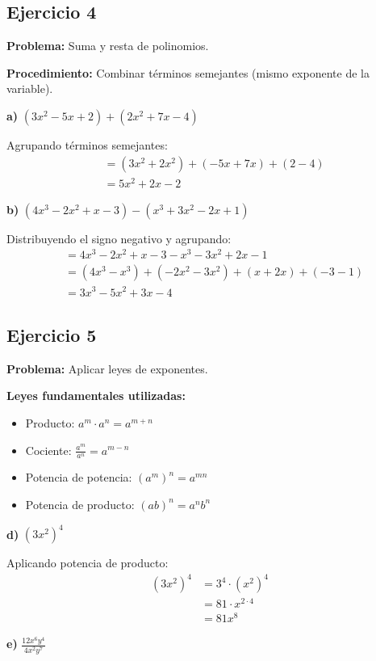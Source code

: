 \subsection*{Ejercicio 4}

\textbf{Problema:} Suma y resta de polinomios.

\textbf{Procedimiento:} Combinar términos semejantes (mismo exponente de la variable).

\textbf{a)} $(3x^2 - 5x + 2) + (2x^2 + 7x - 4)$

Agrupando términos semejantes:
\begin{align}
&= (3x^2 + 2x^2) + (-5x + 7x) + (2 - 4)\\
&= 5x^2 + 2x - 2
\end{align}

\textbf{b)} $(4x^3 - 2x^2 + x - 3) - (x^3 + 3x^2 - 2x + 1)$

Distribuyendo el signo negativo y agrupando:
\begin{align}
&= 4x^3 - 2x^2 + x - 3 - x^3 - 3x^2 + 2x - 1\\
&= (4x^3 - x^3) + (-2x^2 - 3x^2) + (x + 2x) + (-3 - 1)\\
&= 3x^3 - 5x^2 + 3x - 4
\end{align}

\subsection*{Ejercicio 5}

\textbf{Problema:} Aplicar leyes de exponentes.

\textbf{Leyes fundamentales utilizadas:}
\begin{itemize}
    \item Producto: $a^m \cdot a^n = a^{m+n}$
    \item Cociente: $\frac{a^m}{a^n} = a^{m-n}$
    \item Potencia de potencia: $(a^m)^n = a^{mn}$
    \item Potencia de producto: $(ab)^n = a^n b^n$
\end{itemize}

\textbf{d)} $(3x^2)^4$

Aplicando potencia de producto:
\begin{align}
(3x^2)^4 &= 3^4 \cdot (x^2)^4\\
&= 81 \cdot x^{2 \cdot 4}\\
&= 81x^8
\end{align}

\textbf{e)} $\frac{12x^6y^4}{4x^2y^7}$

